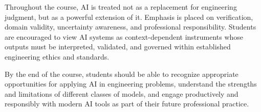 \documentclass[12pt]{article}
\begin{document}
Throughout the course, AI is treated not as a replacement for engineering judgment, but as a powerful extension of it. Emphasis is placed on verification, domain validity, uncertainty awareness, and professional responsibility. Students are encouraged to view AI systems as context-dependent instruments whose outputs must be interpreted, validated, and governed within established engineering ethics and standards.

By the end of the course, students should be able to recognize appropriate opportunities for applying AI in engineering problems, understand the strengths and limitations of different classes of models, and engage productively and responsibly with modern AI tools as part of their future professional practice.




\end{document}
